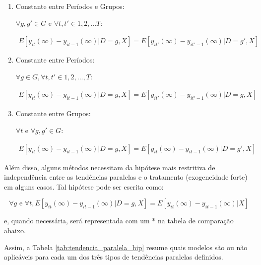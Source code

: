 \documentclass[portugues]{article}
\begin{document}
\begin{enumerate}

    \item Constante entre Períodos e Grupos:

    $\forall g,g' \in G \text{ e } \forall t,t' \in {1,2, ... T}$:

    \[
    \begin{split}
         E[y_{it}(\infty) - y_{it-1}(\infty) | D=g, X] = E[y_{it'}(\infty) - y_{it'-1}(\infty) | D=g', X]
    \end{split}
    \]

    \item Constante entre Períodos:

    $\forall g \in G, \forall t,t' \in {1,2,...,T}$:

    \[
    \begin{split}
         E[y_{it}(\infty) - y_{it-1}(\infty) | D=g, X] = E[y_{it'}(\infty) - y_{it'-1}(\infty) | D=g, X]
    \end{split}
    \]

    \item Constante entre Grupos:

    $\forall t \text{ e } \forall g,g' \in G$:

    \[
    \begin{split}
         E[y_{it}(\infty) - y_{it-1}(\infty) | D=g, X] = E[y_{it}(\infty) - y_{it-1}(\infty) | D=g', X]
    \end{split}
    \]
    
\end{enumerate}

Além disso, alguns métodos necessitam da hipótese mais restritiva de independência entre as tendências paralelas e o tratamento (exogeneidade forte) em alguns casos. Tal hipótese pode ser escrita como:

$$\forall g \text{ e } \forall t, E[y_{it}(\infty) - y_{it-1}(\infty)|D=g, X] =  E[y_{it}(\infty) - y_{it-1}(\infty)| X] $$

\noindent e, quando necessária, será representada com um * na tabela de comparação abaixo.

Assim, a Tabela \ref{tab:tendencia_paralela_hip} resume quais modelos são ou não aplicáveis para cada um dos três tipos de tendências paralelas definidos.
\end{document}

